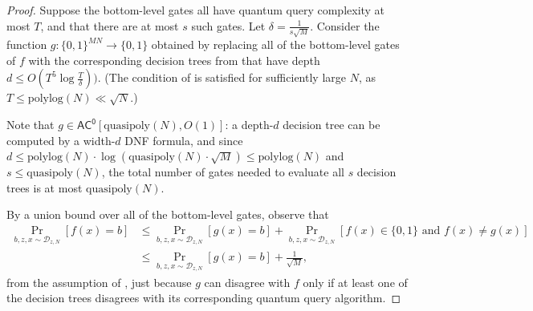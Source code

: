 \documentclass[10pt,a4paper]{article}
\newcommand{\polylog}{\mathrm{polylog}}
\newcommand{\quasipoly}{\mathrm{quasipoly}}
\begin{document}
\begin{proof}
Suppose the bottom-level gates all have quantum query complexity at most $T$, and that there are at most $s$ such gates. Let $\delta = \frac{1}{s\sqrt{M}}$. Consider the function $g: \{0,1\}^{MN} \to \{0,1\}$ obtained by replacing all of the bottom-level gates of $f$ with the corresponding decision trees from  that have depth $d \le O\left(T^5\log \frac{T}{\delta}\right))$. (The condition of  is satisfied for sufficiently large $N$, as $T \le \polylog(N) \ll \sqrt{N}$.)

Note that $g \in \mathsf{AC^0}[\quasipoly(N), O(1)]$: a depth-$d$ decision tree can be computed by a width-$d$ DNF formula, and since $d \le \polylog(N) \cdot \log\left(\quasipoly(N) \cdot \sqrt{M}\right) \le \polylog(N)$ and $s \le \quasipoly(N)$, the total number of gates needed to evaluate all $s$ decision trees is at most $\quasipoly(N)$.

By a union bound over all of the bottom-level gates, observe that
\begin{align}
\Pr_{b,z,x \sim \mathcal{D}_{z,N}} \left[f(x) = b \right]
&\le \Pr_{b,z,x \sim \mathcal{D}_{z,N}} \left[g(x) = b \right] + \Pr_{b,z,x \sim \mathcal{D}_{z,N}}\left[f(x) \in \{0,1\} \text{ and } f(x) \neq g(x) \right]\nonumber\\
&\le \Pr_{b,z,x \sim \mathcal{D}_{z,N}} \left[g(x) = b \right] + \frac{1}{\sqrt{M}},\label{eq:forrelation_of_ors_classical_sim}
\end{align}
from the assumption of , just because $g$ can disagree with $f$ only if at least one of the decision trees disagrees with its corresponding quantum query algorithm.


\end{proof}
\end{document}

